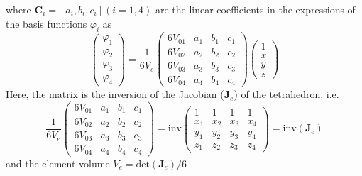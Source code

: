 \documentclass[12pt]{book}               %
\begin{document}
where $\mathbf{C}_i = [a_i,b_i,c_i] (i=1,4)$ are the linear coefficients in the expressions of the basis functions $\varphi_i$ as
\begin{equation}
\left(
\begin{array}{l}
\varphi_1\\
\varphi_2\\
\varphi_3\\
\varphi_4
\end{array}\right)=\frac{1}{6V_e}\left(
\begin{array}{llll}
6V_{01} & a_1 & b_1 & c_1 \\
6V_{02} & a_2 & b_2 & c_2 \\
6V_{03} & a_3 & b_3 & c_3 \\
6V_{04} & a_4 & b_4 & c_4 
\end{array}
\right)\left(
\begin{array}{l}
1\\
x\\
y\\
z
\end{array}\right)
\end{equation}
Here, the matrix is the inversion of the Jacobian ($\mathbf{J}_e$) of the tetrahedron, i.e.
\begin{equation}\frac{1}{6V_e}
\left(
\begin{array}{llll}
6V_{01} & a_1 & b_1 & c_1 \\
6V_{02} & a_2 & b_2 & c_2 \\
6V_{03} & a_3 & b_3 & c_3 \\
6V_{04} & a_4 & b_4 & c_4 
\end{array}
\right)=\textrm{inv}\left(
\begin{array}{llll}
1 & 1 & 1 & 1 \\
x_1 & x_2 & x_3 & x_4 \\
y_1 & y_2 & y_3 & y_4 \\
z_1 & z_2 & z_3 & z_4  
\end{array}
\right)=\textrm{inv}(\mathbf{J}_e)
\end{equation}
and the element volume $V_e=\textrm{det}(\mathbf{J}_e)/6$
\end{document}

